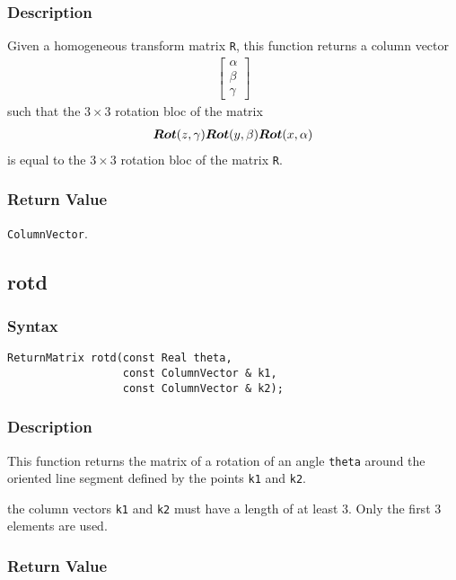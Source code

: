 \documentclass[dvips,11pt,fleqn]{report}
\newcommand{\mbold}[1]{\mbox{\boldmath $ #1 $}}
\newcommand{\matr}[2]{\left[\begin{array}{#1} #2 \end{array}\right]}
\begin{document}
\subsubsection*{Description}
Given a homogeneous transform matrix {\tt R}, this function returns a column vector
\begin{eqnarray}
\matr{c}{\alpha \\ \beta \\ \gamma}
\end{eqnarray}
such that the $3 \times 3$ rotation bloc of the matrix
\begin{eqnarray}
\mbold{Rot}(z,\gamma) \mbold{Rot}(y,\beta) \mbold{Rot}(x,\alpha)
\end{eqnarray}
is equal to the $3 \times 3$ rotation bloc of the matrix {\tt R}.


\subsubsection*{Return Value}

{\tt ColumnVector}.

\newpage

\subsection*{rotd}
\subsubsection*{Syntax}
\begin{verbatim}
ReturnMatrix rotd(const Real theta, 
                  const ColumnVector & k1, 
                  const ColumnVector & k2);
\end{verbatim}
\subsubsection*{Description}
This function returns the matrix of a rotation of an angle {\tt theta} around 
the oriented line segment defined by the points {\tt k1} and {\tt k2}.

 the column vectors {\tt k1} and {\tt k2} must have a length of at least 3. 
Only the first 3 elements are used.

\subsubsection*{Return Value}
\end{document}
